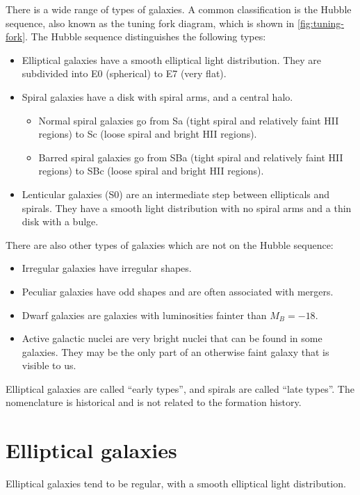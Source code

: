 There is a wide range of types of galaxies.
A common classification is the Hubble sequence, also known as the tuning fork diagram, which is shown in \cref{fig:tuning-fork}.
The Hubble sequence distinguishes the following types:
\begin{itemize}
	\item Elliptical galaxies have a smooth elliptical light distribution. They are subdivided into E0 (spherical) to E7 (very flat).
	\item Spiral galaxies have a disk with spiral arms, and a central halo.
	\begin{itemize}
		\item Normal spiral galaxies go from Sa (tight spiral and relatively faint HII regions) to Sc (loose spiral and bright HII regions).
		\item Barred spiral galaxies go from SBa (tight spiral and relatively faint HII regions) to SBc (loose spiral and bright HII regions).
	\end{itemize}
	\item Lenticular galaxies (S0) are an intermediate step between ellipticals and spirals. They have a smooth light distribution with no spiral arms and a thin disk with a bulge. 
\end{itemize}
There are also other types of galaxies which are not on the Hubble sequence:
\begin{itemize}
	\item Irregular galaxies have irregular shapes.
	\item Peculiar galaxies have odd shapes and are often associated with mergers.
	\item Dwarf galaxies are galaxies with luminosities fainter than $M_B = -18$.
	\item Active galactic nuclei are very bright nuclei that can be found in some galaxies. They may be the only part of an otherwise faint galaxy that is visible to us.
\end{itemize}

Elliptical galaxies are called \enquote{early types}, and spirals are called \enquote{late types}.
The nomenclature is historical and is not related to the formation history.



\section{Elliptical galaxies}
Elliptical galaxies tend to be regular, with a smooth elliptical light distribution.

